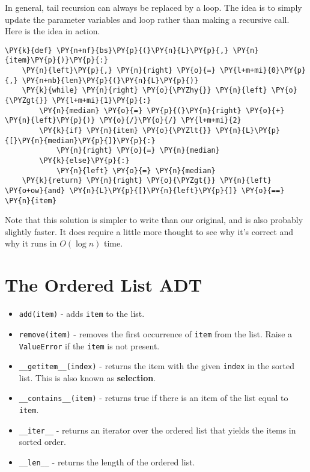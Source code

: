 In general, tail recursion can always be replaced by a loop.
The idea is to simply update the parameter variables and loop rather than making a recursive call.
Here is the idea in action.

\begin{Verbatim}[commandchars=\\\{\}]
\PY{k}{def} \PY{n+nf}{bs}\PY{p}{(}\PY{n}{L}\PY{p}{,} \PY{n}{item}\PY{p}{)}\PY{p}{:}
    \PY{n}{left}\PY{p}{,} \PY{n}{right} \PY{o}{=} \PY{l+m+mi}{0}\PY{p}{,} \PY{n+nb}{len}\PY{p}{(}\PY{n}{L}\PY{p}{)}
    \PY{k}{while} \PY{n}{right} \PY{o}{\PYZhy{}} \PY{n}{left} \PY{o}{\PYZgt{}} \PY{l+m+mi}{1}\PY{p}{:}
        \PY{n}{median} \PY{o}{=} \PY{p}{(}\PY{n}{right} \PY{o}{+} \PY{n}{left}\PY{p}{)} \PY{o}{/}\PY{o}{/} \PY{l+m+mi}{2}
        \PY{k}{if} \PY{n}{item} \PY{o}{\PYZlt{}} \PY{n}{L}\PY{p}{[}\PY{n}{median}\PY{p}{]}\PY{p}{:}
            \PY{n}{right} \PY{o}{=} \PY{n}{median}
        \PY{k}{else}\PY{p}{:}
            \PY{n}{left} \PY{o}{=} \PY{n}{median}
    \PY{k}{return} \PY{n}{right} \PY{o}{\PYZgt{}} \PY{n}{left} \PY{o+ow}{and} \PY{n}{L}\PY{p}{[}\PY{n}{left}\PY{p}{]} \PY{o}{==} \PY{n}{item}
\end{Verbatim}



Note that this solution is simpler to write than our original, and is also probably slightly faster.
It does require a little more thought to see why it's correct and why it runs in $O(\log n)$ time.

\section{The Ordered List ADT}

\begin{itemize}

\item \texttt{add(item)} - adds \texttt{item} to the list.

\item \texttt{remove(item)} - removes the first occurrence of \texttt{item} from the list. Raise a \texttt{ValueError} if the \texttt{item} is not present.

\item \texttt{\_\_getitem\_\_(index)} - returns the item with the given \texttt{index} in the sorted list.   This is also known as \textbf{selection}.

\item \texttt{\_\_contains\_\_(item)} - returns true if there is an item of the list equal to \texttt{item}.

\item \texttt{\_\_iter\_\_} - returns an iterator over the ordered list that yields the items in sorted order.

\item \texttt{\_\_len\_\_} - returns the length of the ordered list.

\end{itemize}

